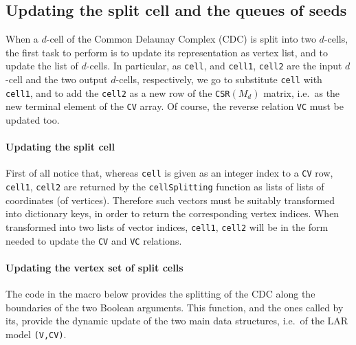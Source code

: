 \documentclass[11pt,oneside]{article}	%
\begin{document}


\subsection{Updating the split cell and the queues of seeds}

When a $d$-cell of the Common Delaunay Complex (CDC) is split into two $d$-cells, the first task to perform is to update its representation as vertex list, and to update the list of $d$-cells. In particular, as \texttt{cell}, and \texttt{cell1}, \texttt{cell2} are the input $d$-cell and the two output $d$-cells, respectively, we go to substitute \texttt{cell} with \texttt{cell1}, and to add the \texttt{cell2} as a new row of the \texttt{CSR}$(M_d)$ matrix, i.e.~as the new terminal element of the \texttt{CV} array. Of course, the reverse relation \texttt{VC} must be updated too.

\paragraph{Updating the split cell} 
First of all notice that, whereas \texttt{cell} is given as an integer index to a \texttt{CV} row,
\texttt{cell1}, \texttt{cell2} are returned by the \texttt{cellSplitting} function as lists of lists of coordinates (of vertices). Therefore such vectors must be suitably transformed into dictionary keys, in order to return the corresponding vertex indices. When transformed into two lists of vector indices, \texttt{cell1}, \texttt{cell2} will be in the form needed to update the \texttt{CV} and \texttt{VC} relations.

\paragraph{Updating the vertex set of split cells}
The code in the macro below provides the splitting of the CDC along the boundaries of the two Boolean arguments.
This function, and the ones called by its, provide the dynamic update of the two main data structures, i.e.~of the LAR model \texttt{(V,CV)}.
\end{document}
